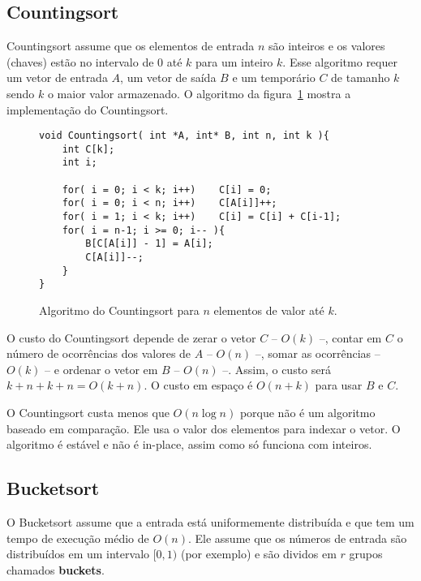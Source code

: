 \subsection{Countingsort}

Countingsort assume que os elementos de entrada $n$ são inteiros e
os valores (chaves) estão no intervalo de $0$ até $k$ para um inteiro $k$.
Esse algoritmo requer um vetor de entrada $A$, um vetor de saída $B$ e um
temporário $C$ de tamanho $k$ sendo $k$ o maior valor armazenado.
O algoritmo da figura~\ref{aula03:algo:counting} mostra a implementação do
Countingsort.
%
\begin{figure}[!htb]
\centering
\begin{framed}
\begin{lstlisting}
void Countingsort( int *A, int* B, int n, int k ){
	int C[k];
	int i;

	for( i = 0; i < k; i++)    C[i] = 0;
	for( i = 0; i < n; i++)    C[A[i]]++;
	for( i = 1; i < k; i++)    C[i] = C[i] + C[i-1];
	for( i = n-1; i >= 0; i-- ){
		B[C[A[i]] - 1] = A[i];
		C[A[i]]--;
	}
}
\end{lstlisting}
\end{framed}
\caption{Algoritmo do Countingsort para $n$ elementos de valor até $k$.}
\label{aula03:algo:counting}
\end{figure}

O custo do Countingsort depende de zerar o vetor $C$ -- $O(k)$ --, 
contar em $C$ o número de ocorrências dos valores de $A$ -- $O(n)$ --,
somar as ocorrências -- $O(k)$ -- e ordenar o vetor em $B$ -- $O(n)$ --.
Assim, o custo será $k + n + k + n = O(k + n)$.
O custo em espaço é $O(n + k)$ para usar $B$ e $C$.

O Countingsort custa menos que $O(n \log n)$ porque não é um algoritmo baseado
em comparação.  Ele usa o valor dos elementos para indexar o vetor.
O algoritmo é estável e não é in-place, assim como só funciona com inteiros.

\subsection{Bucketsort}

O Bucketsort assume que a entrada está uniformemente distribuída e que tem um
tempo de execução médio de $O(n)$.
Ele assume que os números de entrada são distribuídos em um intervalo $[0,1)$ (por exemplo)
e são dividos em $r$ grupos chamados {\bf buckets}.

